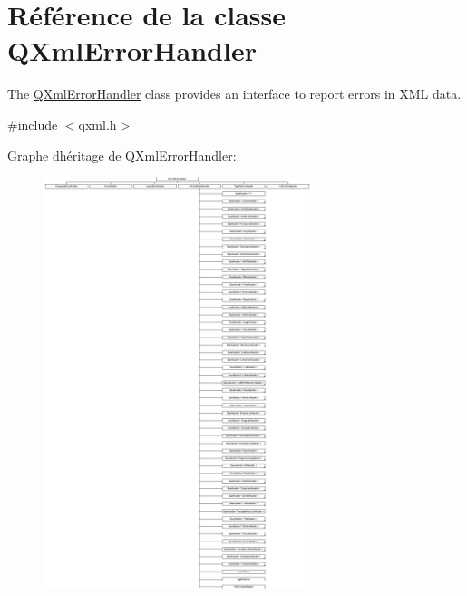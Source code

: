 \hypertarget{class_q_xml_error_handler}{}\section{Référence de la classe Q\+Xml\+Error\+Handler}
\label{class_q_xml_error_handler}


The \hyperlink{class_q_xml_error_handler}{Q\+Xml\+Error\+Handler} class provides an interface to report errors in X\+M\+L data.  




{\ttfamily \#include $<$qxml.\+h$>$}

Graphe d\textquotesingle{}héritage de Q\+Xml\+Error\+Handler\+:\begin{figure}[H]
\begin{center}
\leavevmode
\includegraphics[height=12.000000cm]{class_q_xml_error_handler}
\end{center}
\end{figure}
